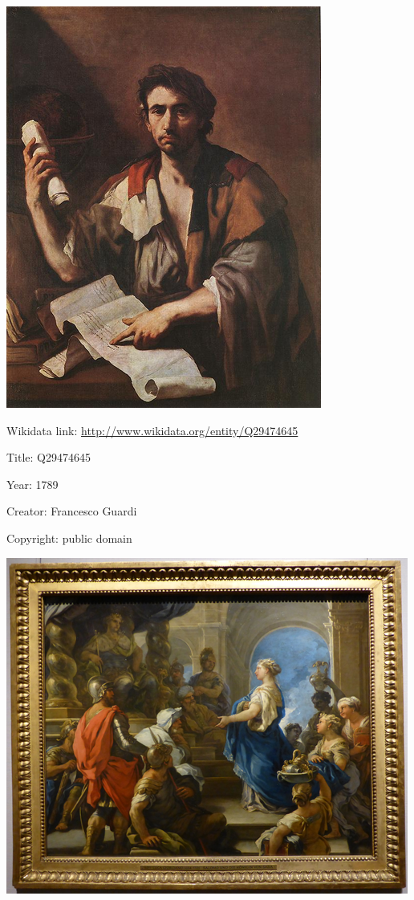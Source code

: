 \documentclass[
  letterpaper,
]{book}
\begin{document}
\includegraphics{painting-collection_files/figure-pdf/cell-2-output-4.png}

Wikidata link: \url{http://www.wikidata.org/entity/Q29474645}

Title: Q29474645

Year: 1789

Creator: Francesco Guardi

Copyright: public domain

\includegraphics{painting-collection_files/figure-pdf/cell-2-output-6.png}


\backmatter
\end{document}
